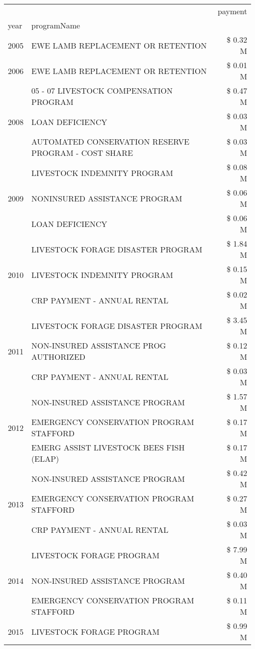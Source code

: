 \begin{tabular}{llr}
\toprule
 &  & payment \\
year & programName &  \\
\midrule
2005 & EWE LAMB REPLACEMENT OR RETENTION & \$ 0.32 M \\
\cline{1-3}
2006 & EWE LAMB REPLACEMENT OR RETENTION & \$ 0.01 M \\
\cline{1-3}
\multirow[t]{3}{*}{2008} & 05 - 07 LIVESTOCK COMPENSATION PROGRAM & \$ 0.47 M \\
 & LOAN DEFICIENCY & \$ 0.03 M \\
 & AUTOMATED CONSERVATION RESERVE PROGRAM - COST SHARE & \$ 0.03 M \\
\cline{1-3}
\multirow[t]{3}{*}{2009} & LIVESTOCK INDEMNITY PROGRAM & \$ 0.08 M \\
 & NONINSURED ASSISTANCE PROGRAM & \$ 0.06 M \\
 & LOAN DEFICIENCY & \$ 0.06 M \\
\cline{1-3}
\multirow[t]{3}{*}{2010} & LIVESTOCK FORAGE DISASTER PROGRAM & \$ 1.84 M \\
 & LIVESTOCK INDEMNITY PROGRAM & \$ 0.15 M \\
 & CRP PAYMENT - ANNUAL RENTAL & \$ 0.02 M \\
\cline{1-3}
\multirow[t]{3}{*}{2011} & LIVESTOCK FORAGE DISASTER PROGRAM & \$ 3.45 M \\
 & NON-INSURED ASSISTANCE PROG AUTHORIZED & \$ 0.12 M \\
 & CRP PAYMENT - ANNUAL RENTAL & \$ 0.03 M \\
\cline{1-3}
\multirow[t]{3}{*}{2012} & NON-INSURED ASSISTANCE PROGRAM & \$ 1.57 M \\
 & EMERGENCY CONSERVATION PROGRAM STAFFORD & \$ 0.17 M \\
 & EMERG ASSIST LIVESTOCK BEES FISH (ELAP) & \$ 0.17 M \\
\cline{1-3}
\multirow[t]{3}{*}{2013} & NON-INSURED ASSISTANCE PROGRAM & \$ 0.42 M \\
 & EMERGENCY CONSERVATION PROGRAM STAFFORD & \$ 0.27 M \\
 & CRP PAYMENT - ANNUAL RENTAL & \$ 0.03 M \\
\cline{1-3}
\multirow[t]{3}{*}{2014} & LIVESTOCK FORAGE PROGRAM & \$ 7.99 M \\
 & NON-INSURED ASSISTANCE PROGRAM & \$ 0.40 M \\
 & EMERGENCY CONSERVATION PROGRAM STAFFORD & \$ 0.11 M \\
\cline{1-3}
\multirow[t]{3}{*}{2015} & LIVESTOCK FORAGE PROGRAM & \$ 0.99 M \\

\end{tabular}
